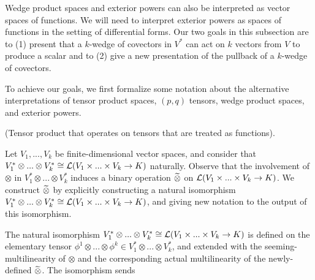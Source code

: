 Wedge product spaces and exterior powers can also be interpreted as vector spaces of functions. We will need to interpret exterior powers as spaces of functions in the setting of differential forms. Our two goals in this subsection are to (1) present that a $k$-wedge of covectors in $V^*$ can act on $k$ vectors from $V$ to produce a scalar and to (2) give a new presentation of the pullback of a $k$-wedge of covectors.

To achieve our goals, we first formalize some notation about the alternative interpretations of tensor product spaces, $(p, q)$ tensors, wedge product spaces, and exterior powers.

\begin{deriv}
    (Tensor product that operates on tensors that are treated as functions).
    
    Let $V_1, ..., V_k$ be finite-dimensional vector spaces, and consider that $V_1^* \otimes ... \otimes V_k^* \cong \mathcal{L}(V_1 \times ... \times V_k \rightarrow K)$ naturally. Observe that the involvement of $\otimes$ in $V_1^* \otimes ... \otimes V_k^*$ induces a binary operation $\widetilde{\otimes}$ on $\mathcal{L}(V_1 \times ... \times V_k \rightarrow K)$. We construct $\widetilde{\otimes}$ by explicitly constructing a natural isomorphism $V_1^* \otimes ... \otimes V_k^*  \cong \mathcal{L}(V_1 \times ... \times V_k \rightarrow K)$, and giving new notation to the output of this isomorphism. 
    
    The natural isomorphism $V_1^* \otimes ... \otimes V_k^* \cong \mathcal{L}(V_1 \times ... \times V_k \rightarrow K)$ is defined on the elementary tensor $\phi^1 \otimes ... \otimes \phi^k \in V_1^* \otimes ... \otimes V_k^*$, and extended with the seeming-multilinearity of $\otimes$ and the corresponding actual multilinearity of the newly-defined $\widetilde{\otimes}$. The isomorphism sends
    
    

\end{deriv}
